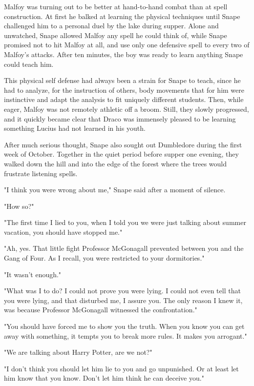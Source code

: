 \documentclass[a4paper,11pt]{article}
\begin{document}
Malfoy was turning out to be better at hand-to-hand combat than at spell construction. At first he balked at learning the physical techniques until Snape challenged him to a personal duel by the lake during supper. Alone and unwatched, Snape allowed Malfoy any spell he could think of, while Snape promised not to hit Malfoy at all, and use only one defensive spell to every two of Malfoy's attacks. After ten minutes, the boy was ready to learn anything Snape could teach him.

This physical self defense had always been a strain for Snape to teach, since he had to analyze, for the instruction of others, body movements that for him were instinctive and adapt the analysis to fit uniquely different students. Then, while eager, Malfoy was not remotely athletic off a broom. Still, they slowly progressed, and it quickly became clear that Draco was immensely pleased to be learning something Lucius had not learned in his youth.

After much serious thought, Snape also sought out Dumbledore during the first week of October. Together in the quiet period before supper one evening, they walked down the hill and into the edge of the forest where the trees would frustrate listening spells.

"I think you were wrong about me," Snape said after a moment of silence.

"How so?"

"The first time I lied to you, when I told you we were just talking about summer vacation, you should have stopped me."

"Ah, yes. That little fight Professor McGonagall prevented between you and the Gang of Four. As I recall, you were restricted to your dormitories."

"It wasn't enough."

"What was I to do? I could not prove you were lying. I could not even tell that you were lying, and that disturbed me, I assure you. The only reason I knew it, was because Professor McGonagall witnessed the confrontation."

"You should have forced me to show you the truth. When you know you can get away with something, it tempts you to break more rules. It makes you arrogant."

"We are talking about Harry Potter, are we not?"

"I don't think you should let him lie to you and go unpunished. Or at least let him know that you know. Don't let him think he can deceive you."
\end{document}
